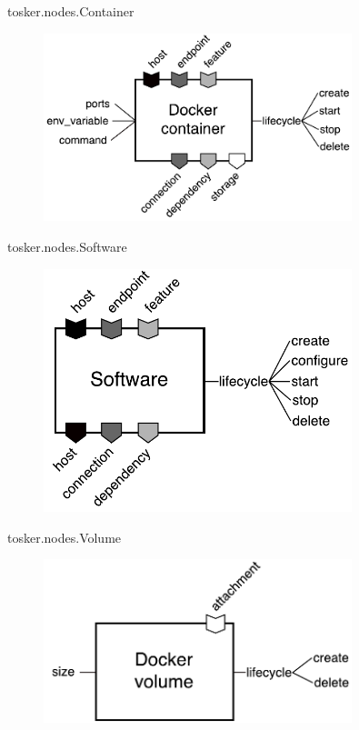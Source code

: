 \documentclass{beamer}
\begin{document}
  \begin{frame}{tosker.nodes.Container}
    \begin{figure}
      \includegraphics[width=0.8\textwidth]{img/tosker_types_container.pdf}
    \end{figure}
  \end{frame}

  \begin{frame}{tosker.nodes.Software}
    \begin{figure}
      \includegraphics[width=0.8\textwidth]{img/tosker_types_software.pdf}
    \end{figure}
  \end{frame}

  \begin{frame}{tosker.nodes.Volume}
    \begin{figure}
      \includegraphics[width=0.8\textwidth]{img/tosker_types_volume.pdf}
    \end{figure}
  \end{frame}
\end{document}
